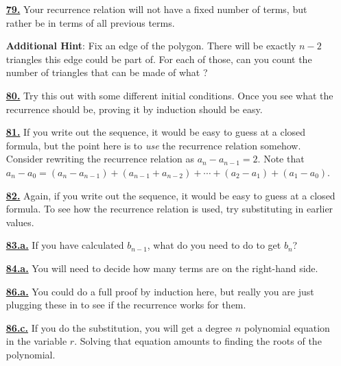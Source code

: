 \documentclass[10pt,]{book}
\theoremstyle{plain}
\theoremstyle{definition}
\theoremstyle{definition}
\theoremstyle{definition}
\numberwithin{equation}{chapter}
\begin{document}
\begin{itemize}[itemsep=1em]
\hypertarget{a-79}{}\item[\textbf{\hyperref[act-catalanfirst]{79.}}]
\hypertarget{p-484}{}%
Your recurrence relation will not have a fixed number of terms, but rather be in terms of all previous terms.%

\par\smallskip
\noindent\textbf{Additional Hint}: \hypertarget{p-485}{}%
Fix an edge of the polygon.  There will be exactly \(n-2\) triangles this edge could be part of.  For each of those, can you count the number of triangles that can be made of what ?%

\hypertarget{a-80}{}\item[\textbf{\hyperref[activity-80]{80.}}]
\hypertarget{p-489}{}%
Try this out with some different initial conditions.  Once you see what the recurrence should be, proving it by induction should be easy.%

\hypertarget{a-81}{}\item[\textbf{\hyperref[act-arithmetic]{81.}}]
\hypertarget{p-493}{}%
If you write out the sequence, it would be easy to guess at a closed formula, but the point here is to \emph{use} the recurrence relation somehow.  Consider rewriting the recurrence relation as \(a_n - a_{n-1} = 2\).  Note that \(a_n - a_0 = (a_n - a_{n-1}) + (a_{n-1} + a_{n-2}) + \cdots + (a_2 - a_1) + (a_1 - a_0)\).%

\hypertarget{a-82}{}\item[\textbf{\hyperref[act-geometric]{82.}}]
\hypertarget{p-495}{}%
Again, if you write out the sequence, it would be easy to guess at a closed formula.  To see how the recurrence relation is used, try substituting in earlier values.%

\hypertarget{a-83.a}{}\item[\textbf{\hyperref[task-104]{83.a.}}]
\hypertarget{p-501}{}%
If you have calculated \(b_{n-1}\), what do you need to do to get \(b_n\)?%

\hypertarget{a-84.a}{}\item[\textbf{\hyperref[task-108]{84.a.}}]
\hypertarget{p-509}{}%
You will need to decide how many terms are on the right-hand side.%

\hypertarget{a-86.a}{}\item[\textbf{\hyperref[task-111]{86.a.}}]
\hypertarget{p-518}{}%
You could do a full proof by induction here, but really you are just plugging these in to see if the recurrence works for them.%

\hypertarget{a-86.c}{}\item[\textbf{\hyperref[task-113]{86.c.}}]
\hypertarget{p-521}{}%
If you do the substitution, you will get a degree \(n\) polynomial equation in the variable \(r\).  Solving that equation amounts to finding the roots of the polynomial.%


\end{itemize}
\end{document}
